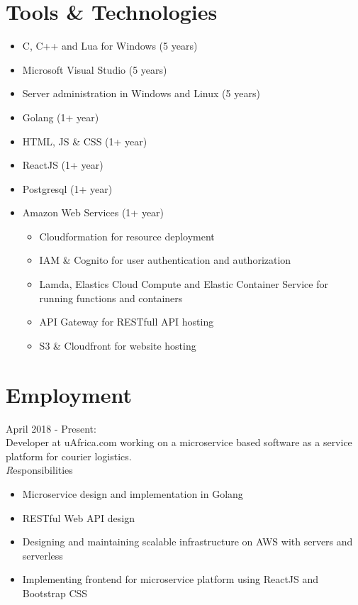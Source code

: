 \documentclass[11pt,a4paper]{article}
\begin{document}
\section*{Tools \& Technologies}
\begin{itemize}
	\item C, C++ and Lua for Windows (5 years)
	\item Microsoft Visual Studio (5 years)
	\item Server administration in Windows and Linux (5 years)
	\item Golang (1+ year)
	\item HTML, JS \& CSS (1+ year)
	\item ReactJS (1+ year)
	\item Postgresql (1+ year)
	\item Amazon Web Services (1+ year)
	\begin{itemize}
		\item Cloudformation for resource deployment
		\item IAM \& Cognito for user authentication and authorization
		\item Lamda, Elastics Cloud Compute and Elastic Container Service for running functions and containers 
		\item API Gateway for RESTfull API hosting
		\item S3 \& Cloudfront for website hosting
	\end{itemize}
\end{itemize}

\section*{Employment}
{\noindent\emph\large April 2018 - Present:}\\

Developer at uAfrica.com working on a microservice based software as a service platform for courier logistics.
\\

	{\emph Responsibilities}
	\begin{itemize}
	\item Microservice design and implementation in Golang
	\item RESTful Web API design
	\item Designing and maintaining scalable infrastructure on AWS with servers and serverless
	\item Implementing frontend for microservice platform using ReactJS and Bootstrap CSS
	\end{itemize}
\end{document}
